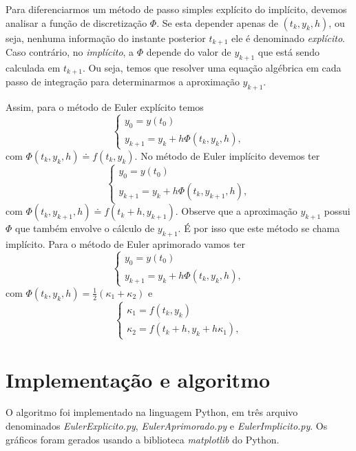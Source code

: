 \documentclass[amsmath,amssymb,floatfix]{revtex4}
\begin{document}
Para diferenciarmos um método de passo simples explícito do implícito, devemos analisar a função de discretização $\Phi$. Se esta depender apenas de $(t_k,y_k,h)$, ou seja, nenhuma informação do instante posterior $t_{k+1}$ ele é denominado \textit{explícito}. Caso contrário, no \textit{implícito}, a $\Phi$ depende do valor de $y_{k+1}$ que está sendo calculada em $t_{k+1}$. Ou seja, temos que resolver uma equação algébrica em cada passo de integração para determinarmos a aproximação $y_{k+1}$. 

Assim, para o método de Euler explícito temos
\begin{equation}\label{def explicito}
\begin{cases}
 y_0 = y(t_0) \\ 
 y_{k+1} = y_k + h \Phi(t_k, y_k, h),
\end{cases}
\end{equation}
com $\Phi(t_k,y_k,h) \doteq f(t_k,y_k)$. No método de Euler implícito devemos ter
\begin{equation}\label{def implicito}
\begin{cases}
 y_0 = y(t_0) \\ 
 y_{k+1} = y_k + h \Phi(t_k, y_{k+1}, h),
\end{cases}
\end{equation}
com $\Phi(t_k,y_{k+1},h) \doteq f(t_k +h,y_{k+1})$. Observe que a aproximação $y_{k+1}$ possui $\Phi$ que também envolve o cálculo de $y_{k+1}$. É por isso que este método se chama implícito. Para o método de Euler aprimorado vamos ter
\begin{equation}\label{def aprimorado}
\begin{cases}
 y_0 = y(t_0) \\ 
 y_{k+1} = y_k + h \Phi(t_k, y_k, h),
\end{cases}
\end{equation}
com $\Phi(t_k,y_k,h) = \frac{1}{2} (\kappa_1 + \kappa_2)$ e 
\begin{equation*}
\begin{cases}
 \kappa_1 = f(t_k,y_k) \\ 
 \kappa_2 = f(t_k +h, y_k + h\kappa_1),
\end{cases}
\end{equation*} 

\section{Implementação e algoritmo}
O algoritmo foi implementado na linguagem Python, em três arquivo denominados \textit{EulerExplicito.py}, \textit{EulerAprimorado.py} e \textit{EulerImplicito.py}. Os gráficos foram gerados usando a biblioteca \textit{matplotlib} do Python.
\end{document}
